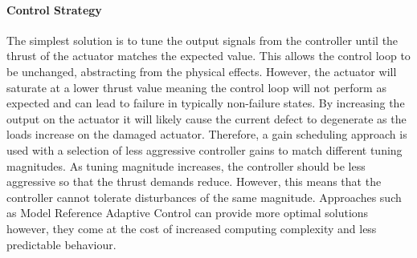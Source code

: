 \paragraph{Control Strategy}\label{para:control_strategy}
The simplest solution is to tune the output signals from the controller until the thrust of the actuator matches the expected value. This allows the control loop to be unchanged, abstracting from the physical effects. However, the actuator will saturate at a lower thrust value meaning the control loop will not perform as expected and can lead to failure in typically non-failure states. By increasing the output on the actuator it will likely cause the current defect to degenerate as the loads increase on the damaged actuator. Therefore, a gain scheduling approach is used with a selection of less aggressive controller gains to match different tuning magnitudes. As tuning magnitude increases, the controller should be less aggressive so that the thrust demands reduce. However, this means that the controller cannot tolerate disturbances of the same magnitude. Approaches such as Model Reference Adaptive Control can provide more optimal solutions however, they come at the cost of increased computing complexity and less predictable behaviour.